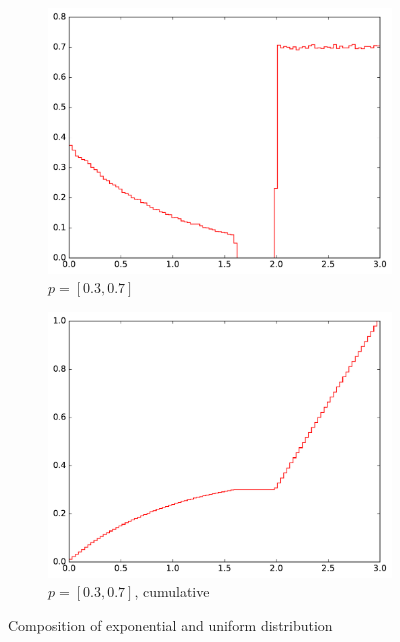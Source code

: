 \begin{figure}
\begin{subfigure}[b]{0.49\textwidth}
        \includegraphics[width=\textwidth]{figs/composed_dist_30_70.pdf}
        \caption{$p = [0.3, 0.7]$}
    \end{subfigure}
    \begin{subfigure}[b]{0.49\textwidth}
        \includegraphics[width=\textwidth]{figs/composed_dist_30_70_cum.pdf}
        \caption{$p = [0.3, 0.7]$, cumulative}
    \end{subfigure}
    \caption{Composition of exponential and uniform distribution}
     \label{fig:composition_exp_uniform}
\end{figure}


